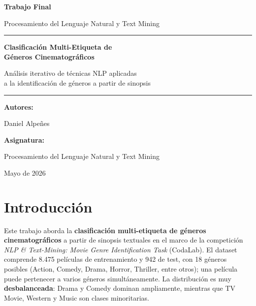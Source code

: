 \documentclass[11pt, a4paper]{article}
\begin{document}
\begin{titlepage}
  \centering
  \vspace*{2cm}
  {\LARGE\bfseries Trabajo Final\par}
  \vspace{0.4cm}
  {\large Procesamiento del Lenguaje Natural y Text Mining\par}
  \vspace{1.5cm}
  \rule{\linewidth}{0.5pt}\par
  \vspace{0.6cm}
  {\Huge\bfseries Clasificación Multi-Etiqueta de\\ Géneros Cinematográficos\par}
  \vspace{0.6cm}
  {\large Análisis iterativo de técnicas NLP aplicadas\\ a la identificación de géneros a partir de sinopsis\par}
  \rule{\linewidth}{0.5pt}\par
  \vspace{2cm}
  {\large\bfseries Autores:\par}
  {\large Daniel Alpeñes\par}
  \vspace{0.8cm}
  {\large\bfseries Asignatura:\par}
  {\large Procesamiento del Lenguaje Natural y Text Mining\par}
  \vspace{0.8cm}
  {\large Mayo de 2026\par}
  \vfill
\end{titlepage}

\tableofcontents
\newpage

\section{Introducción}

Este trabajo aborda la \textbf{clasificación multi-etiqueta de géneros cinematográficos} a partir de sinopsis textuales en el marco de la competición \textit{NLP \& Text-Mining: Movie Genre Identification Task} (CodaLab). El dataset comprende 8.475 películas de entrenamiento y 942 de test, con 18 géneros posibles (Action, Comedy, Drama, Horror, Thriller, entre otros); una película puede pertenecer a varios géneros simultáneamente. La distribución es muy \textbf{desbalanceada}: Drama y Comedy dominan ampliamente, mientras que TV Movie, Western y Music son clases minoritarias.
\end{document}
